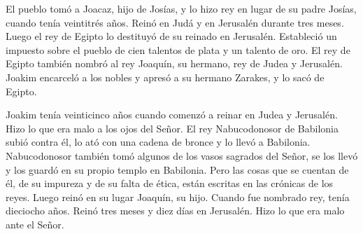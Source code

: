  El pueblo tomó a Joacaz, hijo de Josías, y lo hizo rey
en lugar de su padre Josías, cuando tenía veintitrés años.
 Reinó en Judá y en Jerusalén durante tres meses. Luego
el rey de Egipto lo destituyó de su reinado en Jerusalén.
 Estableció un impuesto sobre el pueblo de cien talentos
de plata y un talento de oro.  El rey de Egipto también
nombró al rey Joaquín, su hermano, rey de Judea y Jerusalén.
 Joakim encarceló a los nobles y apresó a su hermano
Zarakes, y lo sacó de Egipto.

 Joakim tenía veinticinco años cuando comenzó a reinar en
Judea y Jerusalén. Hizo lo que era malo a los ojos del Señor.
 El rey Nabucodonosor de Babilonia subió contra él, lo
ató con una cadena de bronce y lo llevó a Babilonia. 
Nabucodonosor también tomó algunos de los vasos sagrados del Señor, se
los llevó y los guardó en su propio templo en Babilonia. 
Pero las cosas que se cuentan de él, de su impureza y de su falta de
ética, están escritas en las crónicas de los reyes. 
Luego reinó en su lugar Joaquín, su hijo. Cuando fue nombrado rey, tenía
dieciocho años.  Reinó tres meses y diez días en
Jerusalén. Hizo lo que era malo ante el Señor.


